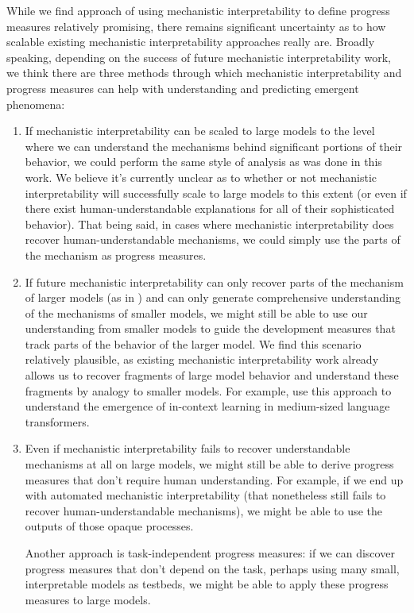 \documentclass{article} %
\begin{document}
\label{sec:further-discussion}
While we find approach of using mechanistic interpretability to define progress measures relatively promising, there remains significant uncertainty as to how scalable existing mechanistic interpretability approaches really are. Broadly speaking, depending on the success of future mechanistic interpretability work, we think there are three methods through which mechanistic interpretability and progress measures can help with understanding and predicting emergent phenomena:
\begin{enumerate}
    \item If mechanistic interpretability can be scaled to large models to the level where we can understand the mechanisms behind significant portions of their behavior, we could perform the same style of analysis as was done in this work.  We believe it's currently unclear as to whether or not mechanistic interpretability will successfully scale to large models to this extent (or even if there exist human-understandable explanations for all of their sophisticated behavior). That being said, in cases where mechanistic interpretability does recover human-understandable mechanisms, we could simply use the parts of the mechanism as progress measures.
    \item If future mechanistic interpretability can only recover parts of the mechanism of larger models (as in \cite{wang2022interpretability}) and can only generate comprehensive understanding of the mechanisms of smaller models, we might still be able to use our understanding from smaller models to guide the development measures that track parts of the behavior of the larger model. We find this scenario relatively plausible, as existing mechanistic interpretability work already allows us to recover fragments of large model behavior and understand these fragments by analogy to smaller models. For example, \citet{olsson2022context} use this approach to understand the emergence of in-context learning in medium-sized language transformers. 
    \item Even if mechanistic interpretability fails to recover understandable mechanisms at all on large models, we might still be able to derive progress measures that don’t require human understanding. For example, if we end up with automated mechanistic interpretability (that nonetheless still fails to recover human-understandable mechanisms), we might be able to use the outputs of those opaque processes. 
    
    Another approach is task-independent progress measures: if we can discover progress measures that don't depend on the task, perhaps using many small, interpretable models as testbeds, we might be able to apply these progress measures to large models. 
\end{enumerate}
\end{document}

